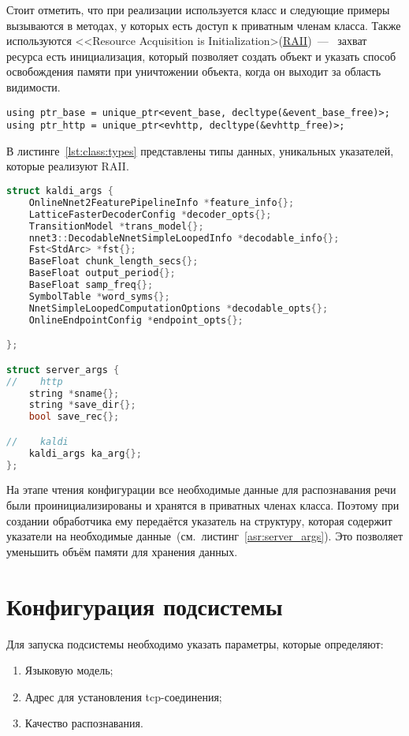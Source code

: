 Стоит отметить, что при реализации используется класс и следующие примеры вызываются
в методах, у которых есть доступ к приватным членам класса. Также используются
<<Resource Acquisition is Initialization>(\hyperlink{raii}{RAII})~---~
захват ресурса есть инициализация, который позволяет создать объект и указать
способ освобождения памяти при уничтожении объекта, когда он выходит за область
видимости.

\begin{lstlisting}[caption={Описание некоторых типов данных}, label={lst:class:types}]
using ptr_base = unique_ptr<event_base, decltype(&event_base_free)>;
using ptr_http = unique_ptr<evhttp, decltype(&evhttp_free)>;
\end{lstlisting}

В листинге~\ref{lst:class:types} представлены типы данных, уникальных указателей,
которые реализуют RAII.

\begin{lstlisting}[caption={структуры для хранения данных},label={asr:server_args},language=C++]
struct kaldi_args {
    OnlineNnet2FeaturePipelineInfo *feature_info{};
    LatticeFasterDecoderConfig *decoder_opts{};
    TransitionModel *trans_model{};
    nnet3::DecodableNnetSimpleLoopedInfo *decodable_info{};
    Fst<StdArc> *fst{};
    BaseFloat chunk_length_secs{};
    BaseFloat output_period{};
    BaseFloat samp_freq{};
    SymbolTable *word_syms{};
    NnetSimpleLoopedComputationOptions *decodable_opts{};
    OnlineEndpointConfig *endpoint_opts{};

};

struct server_args {
//    http
    string *sname{};
    string *save_dir{};
    bool save_rec{};

//    kaldi
    kaldi_args ka_arg{};
};

\end{lstlisting}

На этапе чтения конфигурации все необходимые данные для распознавания речи
были проинициализированы и хранятся в приватных членах класса. Поэтому при
создании обработчика ему передаётся указатель на структуру, которая содержит
указатели на необходимые данные~(см.~листинг~\ref{asr:server_args}). Это позволяет
уменьшить объём памяти для хранения данных.


\section{Конфигурация подсистемы}

Для запуска подсистемы необходимо указать параметры, которые определяют:
\begin{enumerate}
    \item Языковую модель;
    \item Адрес для установления tcp-соединения;
    \item Качество распознавания.
\end{enumerate}

